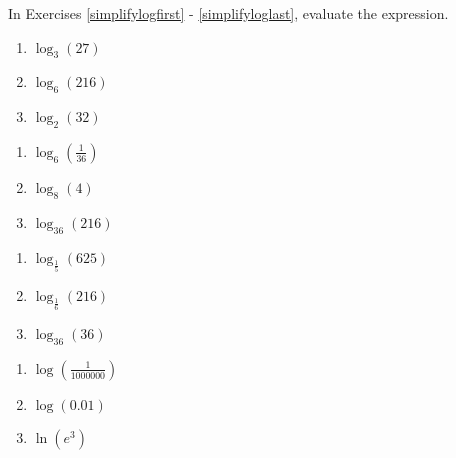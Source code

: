 In Exercises \ref{simplifylogfirst} - \ref{simplifyloglast}, evaluate the expression.

\begin{multicols}{3}
\begin{enumerate}
\setcounter{enumi}{\value{HW}}

\item $\log_{3} (27)$  \label{simplifylogfirst}
\item $\log_{6} (216)$
\item $\log_{2} (32)$

\setcounter{HW}{\value{enumi}}
\end{enumerate}
\end{multicols}


\begin{multicols}{3}
\begin{enumerate}
\setcounter{enumi}{\value{HW}}

\item  $\log_{6} \left( \frac{1}{36} \right)$
\item $\log_{8} (4)$
\item $\log_{36} (216)$

\setcounter{HW}{\value{enumi}}
\end{enumerate}
\end{multicols}


\begin{multicols}{3}
\begin{enumerate}
\setcounter{enumi}{\value{HW}}

\item $\log_{\frac{1}{5}} (625)$
\item  $\log_{\frac{1}{6}} (216)$
\item $\log_{36} (36)$ 

\setcounter{HW}{\value{enumi}}
\end{enumerate}
\end{multicols}


\begin{multicols}{3}
\begin{enumerate}
\setcounter{enumi}{\value{HW}}

\item $\log \left(\frac{1}{1000000}\right)$
\item $\log(0.01)$
\item $\ln\left(e^3\right)$

\setcounter{HW}{\value{enumi}}
\end{enumerate}
\end{multicols}


